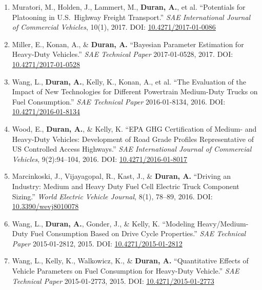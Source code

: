 \documentclass[11pt,letterpaper]{article}
\begin{document}
\begin{enumerate}
  \item Muratori, M., Holden, J., Lammert, M., \textbf{Duran, A.}, et al.
        ``Potentials for Platooning in U.S.\ Highway Freight Transport.''
        \textit{SAE International Journal of Commercial Vehicles}, 10(1), 2017.
        DOI: \href{https://doi.org/10.4271/2017-01-0086}{10.4271/2017-01-0086}

  \item Miller, E., Konan, A., \& \textbf{Duran, A.}
        ``Bayesian Parameter Estimation for Heavy-Duty Vehicles.''
        \textit{SAE Technical Paper} 2017-01-0528, 2017.
        DOI: \href{https://doi.org/10.4271/2017-01-0528}{10.4271/2017-01-0528}

  \item Wang, L., \textbf{Duran, A.}, Kelly, K., Konan, A., et al.
        ``The Evaluation of the Impact of New Technologies for Different Powertrain
        Medium-Duty Trucks on Fuel Consumption.''
        \textit{SAE Technical Paper} 2016-01-8134, 2016.
        DOI: \href{https://doi.org/10.4271/2016-01-8134}{10.4271/2016-01-8134}

  \item Wood, E., \textbf{Duran, A.}, \& Kelly, K.
        ``EPA GHG Certification of Medium- and Heavy-Duty Vehicles: Development of Road
        Grade Profiles Representative of US Controlled Access Highways.''
        \textit{SAE International Journal of Commercial Vehicles}, 9(2):94--104, 2016.
        DOI: \href{https://doi.org/10.4271/2016-01-8017}{10.4271/2016-01-8017}

  \item Marcinkoski, J., Vijayagopal, R., Kast, J., \& \textbf{Duran, A.}
        ``Driving an Industry: Medium and Heavy Duty Fuel Cell Electric Truck Component
        Sizing.''
        \textit{World Electric Vehicle Journal}, 8(1), 78--89, 2016.
        DOI: \href{https://doi.org/10.3390/wevj8010078}{10.3390/wevj8010078}

  \item Wang, L., \textbf{Duran, A.}, Gonder, J., \& Kelly, K.
        ``Modeling Heavy/Medium-Duty Fuel Consumption Based on Drive Cycle Properties.''
        \textit{SAE Technical Paper} 2015-01-2812, 2015.
        DOI: \href{https://doi.org/10.4271/2015-01-2812}{10.4271/2015-01-2812}

  \item Wang, L., Kelly, K., Walkowicz, K., \& \textbf{Duran, A.}
        ``Quantitative Effects of Vehicle Parameters on Fuel Consumption for Heavy-Duty
        Vehicle.''
        \textit{SAE Technical Paper} 2015-01-2773, 2015.
        DOI: \href{https://doi.org/10.4271/2015-01-2773}{10.4271/2015-01-2773}


\end{enumerate}
\end{document}
